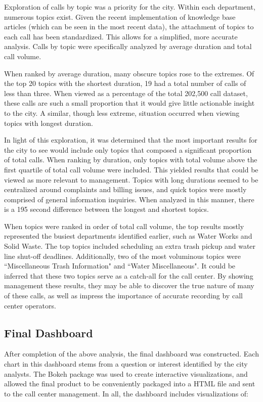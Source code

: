 \documentclass{article}
\begin{document}
Exploration of calls by topic was a priority for the city.  Within each department, numerous topics exist.  Given the recent implementation of knowledge base articles (which can be seen in the most recent data), the attachment of topics to each call has been standardized.  This allows for a simplified, more accurate analysis.  Calls by topic were specifically analyzed by average duration and total call volume.
\par
When ranked by average duration, many obscure topics rose to the extremes.  Of the top 20 topics with the shortest duration, 19 had a total number of calls of less than three.  When viewed as a percentage of the total 202,500 call dataset, these calls are such a small proportion that it would give little actionable insight to the city.  A similar, though less extreme, situation occurred when viewing topics with longest duration.
\par
In light of this exploration, it was determined that the most important results for the city to see would include only topics that composed a significant proportion of total calls.  When ranking by duration, only topics with total volume above the first quartile of total call volume were included.  This yielded results that could be viewed as more relevant to management.  Topics with long durations seemed to be centralized around complaints and billing issues, and quick topics were mostly comprised of general information inquiries.  When analyzed in this manner, there is a 195 second difference between the longest and shortest topics.
\par
When topics were ranked in order of total call volume, the top results mostly represented the busiest departments identified earlier, such as Water Works and Solid Waste. The top topics included scheduling an extra trash pickup and water line shut-off deadlines.  Additionally, two of the most voluminous topics were ``Miscellaneous Trash Information" and ``Water Miscellaneous".  It could be inferred that these two topics serve as a catch-all for the call center.  By showing management these results, they may be able to discover the true nature of many of these calls, as well as impress the importance of accurate recording by call center operators.

	\subsection{Final Dashboard}

After completion of the above analysis, the final dashboard was constructed.  Each chart in this dashboard stems from a question or interest identified by the city analysts.  The Bokeh package was used to create interactive visualizations, and allowed the final product to be conveniently packaged into a HTML file and sent to the call center management.  In all, the dashboard includes visualizations of:
\end{document}
